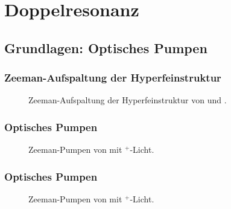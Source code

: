 
\section{Doppelresonanz}
\subsection{Grundlagen: Optisches Pumpen}


\begin{frame}
\frametitle{Zeeman-Aufspaltung der Hyperfeinstruktur}


\begin{figure}
    \centering
    \def\svgwidth{\textwidth}
    
    \caption{Zeeman-Aufspaltung der Hyperfeinstruktur von  und .}
\end{figure}

\end{frame}



\begin{frame}
\frametitle{Optisches Pumpen}

\begin{figure}
   \centering
    \def\svgwidth{\textwidth}
    
    \caption{Zeeman-Pumpen von  mit \textsigma$^+$-Licht.}
\end{figure}

\end{frame}




\begin{frame}[noframenumbering]
\frametitle{Optisches Pumpen}

\begin{figure}
   \centering
    \def\svgwidth{\textwidth}
    
    \caption{Zeeman-Pumpen von  mit \textsigma$^+$-Licht.}
\end{figure}

\end{frame}


